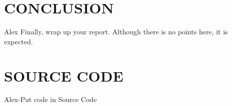 \documentclass[12pt]{article}
\begin{document}
\section{CONCLUSION}
Alex
Finally, wrap up your report. Although there is no points here, it is expected.

\newpage



\newpage
\appendix

\section{SOURCE CODE}
Alex-Put code in
Source Code

\end{document}
